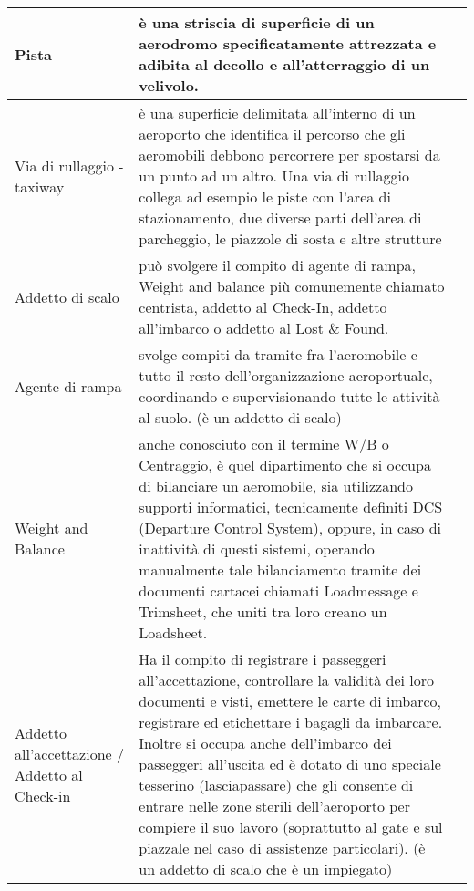 \begin{table}[htp]
{\begin{tabular}{p{}|p{}|p{}}
		\hline
		\textsf{\small Pista} & \textsf{\small è una striscia di superficie di un aerodromo specificatamente attrezzata e adibita al decollo e all'atterraggio di un velivolo.} & \textsf{\small } \\
		\hline
		\textsf{\small Via di rullaggio - taxiway} & \textsf{\small è una superficie delimitata all'interno di un aeroporto che identifica il percorso che gli aeromobili debbono percorrere per spostarsi da un punto ad un altro. Una via di rullaggio collega ad esempio le piste con l'area di stazionamento, due diverse parti dell'area di parcheggio, le piazzole di sosta e altre strutture} & \textsf{\small } \\
		\hline
		\textsf{\small Addetto di scalo} & \textsf{\small può svolgere il compito di agente di rampa, Weight and balance più comunemente chiamato centrista, addetto al Check-In, addetto all'imbarco o addetto al Lost \& Found.} & \textsf{\small } \\
		\hline
		\textsf{\small Agente di rampa} & \textsf{\small  svolge compiti da tramite fra l'aeromobile e tutto il resto dell'organizzazione aeroportuale, coordinando e supervisionando tutte le attività al suolo. (è un addetto di scalo)} & \textsf{\small } \\
		\hline
		\textsf{\small Weight and Balance} & \textsf{\small  anche conosciuto con il termine W/B o Centraggio, è quel dipartimento che si occupa di bilanciare un aeromobile, sia utilizzando supporti informatici, tecnicamente definiti DCS (Departure Control System), oppure, in caso di inattività di questi sistemi, operando manualmente tale bilanciamento tramite dei documenti cartacei chiamati Loadmessage e Trimsheet, che uniti tra loro creano un Loadsheet.} & \textsf{\small } \\
		\hline
		\textsf{\small Addetto all'accettazione / Addetto al Check-in} & \textsf{\small Ha il compito di registrare i passeggeri all'accettazione, controllare la validità dei loro documenti e visti, emettere le carte di imbarco, registrare ed etichettare i bagagli da imbarcare. Inoltre si occupa anche dell'imbarco dei passeggeri all'uscita ed è dotato di uno speciale tesserino (lasciapassare) che gli consente di entrare nelle zone sterili dell'aeroporto per compiere il suo lavoro (soprattutto al gate e sul piazzale nel caso di assistenze particolari). (è un addetto di scalo che è un impiegato)} & \textsf{\small } \\
		\end{tabular}%
	}%
\end{table}

